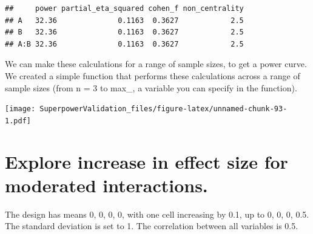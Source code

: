 \documentclass[]{book}
\newenvironment{Shaded}{\begin{snugshade}}{\end{snugshade}}
\newcommand{\DataTypeTok}[1]{\textcolor[rgb]{0.13,0.29,0.53}{#1}}
\newcommand{\DecValTok}[1]{\textcolor[rgb]{0.00,0.00,0.81}{#1}}
\newcommand{\KeywordTok}[1]{\textcolor[rgb]{0.13,0.29,0.53}{\textbf{#1}}}
\newcommand{\NormalTok}[1]{#1}
\newcommand{\OperatorTok}[1]{\textcolor[rgb]{0.81,0.36,0.00}{\textbf{#1}}}
\newcommand{\StringTok}[1]{\textcolor[rgb]{0.31,0.60,0.02}{#1}}
\begin{document}
\begin{verbatim}
##     power partial_eta_squared cohen_f non_centrality
## A   32.36              0.1163  0.3627            2.5
## B   32.36              0.1163  0.3627            2.5
## A:B 32.36              0.1163  0.3627            2.5
\end{verbatim}

We can make these calculations for a range of sample sizes, to get a power curve. We created a simple function that performs these calculations across a range of sample sizes (from n = 3 to max\_, a variable you can specify in the function).

\begin{Shaded}
\end{Shaded}

\texttt{[image: SuperpowerValidation\_files/figure-latex/unnamed-chunk-93-1.pdf]}

\hypertarget{explore-increase-in-effect-size-for-moderated-interactions.}{%
\chapter{Explore increase in effect size for moderated interactions.}\label{explore-increase-in-effect-size-for-moderated-interactions.}}

The design has means 0, 0, 0, 0, with one cell increasing by 0.1, up to 0, 0, 0, 0.5. The standard deviation is set to 1. The correlation between all variables is 0.5.
\end{document}
